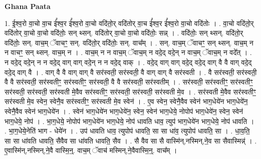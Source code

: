 \documentclass[17pt]{extarticle}
\begin{document}
\textbf{Ghana Paata } \newline

1. ई॒श्व॒रो वा॒चो वा॒च ई᳚श्व॒र ई᳚श्व॒रो वा॒चो वदि॑तो॒र् वदि॑तोर् वा॒च ई᳚श्व॒र ई᳚श्व॒रो वा॒चो वदि॑तोः । . वा॒चो वदि॑तो॒र् वदि॑तोर् वा॒चो वा॒चो वदि॑तोः॒ सन् थ्सन्. वदि॑तोर् वा॒चो वा॒चो वदि॑तोः॒ सन्न् । . वदि॑तोः॒ सन् थ्सन्. वदि॑तो॒र् वदि॑तोः॒ सन्. वाच॒म् ॅवाचꣳ॒॒ सन्. वदि॑तो॒र् वदि॑तोः॒ सन्. वाच᳚म् । . सन्. वाच॒म् ॅवाचꣳ॒॒ सन् थ्सन्. वाच॒म् न न वाचꣳ॒॒ सन् थ्सन्. वाच॒म् न । . वाच॒म् न न वाच॒म् ॅवाच॒म् न वदे॒द् वदे॒न् न वाच॒म् ॅवाच॒म् न वदे᳚त् । . न वदे॒द् वदे॒न् न न वदे॒द् वाग् वाग् वदे॒न् न न वदे॒द् वाक् । . वदे॒द् वाग् वाग् वदे॒द् वदे॒द् वाग् वै वै वाग् वदे॒द् वदे॒द् वाग् वै । . वाग् वै वै वाग् वाग् वै सर॑स्वती॒ सर॑स्वती॒ वै वाग् वाग् वै सर॑स्वती । . वै सर॑स्वती॒ सर॑स्वती॒ वै वै सर॑स्वती॒ सर॑स्वतीꣳ॒॒ सर॑स्वतीꣳ॒॒ सर॑स्वती॒ वै वै सर॑स्वती॒ सर॑स्वतीम् । . सर॑स्वती॒ सर॑स्वतीꣳ॒॒ सर॑स्वतीꣳ॒॒ सर॑स्वती॒ सर॑स्वती॒ सर॑स्वती मे॒वैव सर॑स्वतीꣳ॒॒ सर॑स्वती॒ सर॑स्वती॒ सर॑स्वती मे॒व । . सर॑स्वती मे॒वैव सर॑स्वतीꣳ॒॒ सर॑स्वती मे॒व स्वेन॒ स्वेनै॒व सर॑स्वतीꣳ॒॒ सर॑स्वती मे॒व स्वेन॑ । . ए॒व स्वेन॒ स्वेनै॒वैव स्वेन॑ भाग॒धेये॑न भाग॒धेये॑न॒ स्वेनै॒वैव स्वेन॑ भाग॒धेये॑न । . स्वेन॑ भाग॒धेये॑न भाग॒धेये॑न॒ स्वेन॒ स्वेन॑ भाग॒धेये॒ नोपोप॑ भाग॒धेये॑न॒ स्वेन॒ स्वेन॑ भाग॒धेये॒ नोप॑ । . भा॒ग॒धेये॒ नोपोप॑ भाग॒धेये॑न भाग॒धेये॒ नोप॑ धावति धाव॒ त्युप॑ भाग॒धेये॑न भाग॒धेये॒ नोप॑ धावति । . भा॒ग॒धेये॒नेति॑ भाग - धेये॑न । . उप॑ धावति धाव॒ त्युपोप॑ धावति॒ सा सा धा॑व॒ त्युपोप॑ धावति॒ सा । . धा॒व॒ति॒ सा सा धा॑वति धावति॒ सैवैव सा धा॑वति धावति॒ सैव । . सै वैव सा सै वास्मि॑न्,नस्मिन्,ने॒व सा सैवास्मिन्न्॑ । . ए॒वास्मि॑न्,नस्मिन्,ने॒वै वास्मि॒न्॒. वाच॒म् ॅवाच॑ मस्मिन्,ने॒वैवास्मि॒न्॒. वाच᳚म् । \newline
\end{document}
